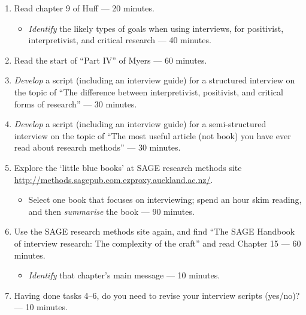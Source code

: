 \documentclass[]{book}
\providecommand{\tightlist}{%
  \setlength{\itemsep}{0pt}\setlength{\parskip}{0pt}}
\theoremstyle{definition}
\theoremstyle{definition}
\theoremstyle{definition}
\theoremstyle{remark}
\begin{document}
\begin{enumerate}
\def\labelenumi{\arabic{enumi}.}
\item
  Read chapter 9 of Huff
  \autocite*{huff_2009_designingresearchpublication} --- 20 minutes.

  \begin{itemize}
  \tightlist
  \item
    \emph{Identify} the likely types of goals when using interviews, for
    positivist, interpretivist, and critical research --- 40 minutes.
  \end{itemize}
\item
  Read the start of ``Part IV'' of Myers \autocite*[
  p.~117--135]{myers_2013_qualitativeresearchbusiness} --- 60 minutes.
\item
  \emph{Develop} a script \autocite*[
  p.~129]{myers_2013_qualitativeresearchbusiness} (including an
  interview guide) for a structured interview on the topic of ``The
  difference between interpretivist, positivist, and critical forms of
  research'' --- 30 minutes.
\item
  \emph{Develop} a script (including an interview guide) for a
  semi-structured interview on the topic of ``The most useful article
  (not book) you have ever read about research methods'' --- 30 minutes.
\item
  Explore the `little blue books' at SAGE research methods site
  \url{http://methods.sagepub.com.ezproxy.auckland.ac.nz/}.

  \begin{itemize}
  \tightlist
  \item
    Select one book that focuses on interviewing; spend an hour skim
    reading, and then \emph{summarise} the book --- 90 minutes.
  \end{itemize}
\item
  Use the SAGE research methods site again, and find ``The SAGE Handbook
  of interview research: The complexity of the craft'' and read Chapter
  15 \autocite{wang_2017_sagehandbookinterview} --- 60 minutes.

  \begin{itemize}
  \tightlist
  \item
    \emph{Identify} that chapter's main message --- 10 minutes.
  \end{itemize}
\item
  Having done tasks 4--6, do you need to revise your interview scripts
  (yes/no)? --- 10 minutes.
\end{enumerate}
\end{document}
